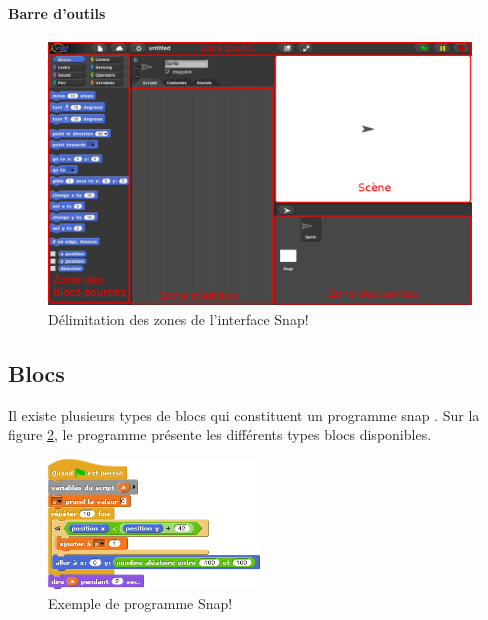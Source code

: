 \paragraph{Barre d'outils}

\begin{figure}
  \begin{center}
  \includegraphics[width=\textwidth]{content/7-solution/2-snap/images/interface}
        \caption{Délimitation des zones de l'interface Snap!}
    \label{fig:snap interface}
  \end{center}
\end{figure}

\subsection{Blocs}
Il existe plusieurs types de blocs qui constituent un programme \gls{snap} \cite{snap-man}. Sur la figure \ref{fig:software-used-script}, le programme présente les différents types blocs disponibles.
\begin{figure}
  \begin{center}
    \includegraphics[width=0.5\textwidth]{content/5-related_work/images/script}
    \caption{Exemple de programme Snap!}
    \label{fig:software-used-script}
  \end{center}
\end{figure}


